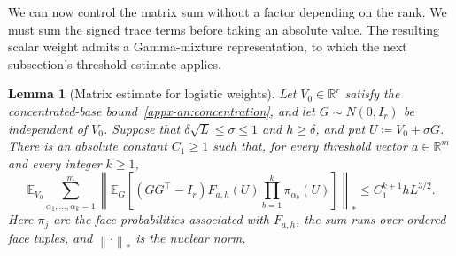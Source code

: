 \documentclass[11pt,letterpaper]{article}
\newtheorem{lemma}{Lemma}
\theoremstyle{remark}
\newcommand{\E}{\mathbb E}
\newcommand{\R}{\mathbb R}
\newcommand{\norm}[1]{\left\lVert#1\right\rVert}
\begin{document}
We can now control the matrix sum without a factor depending on the
rank. We must sum the signed trace terms before taking an absolute value.
The resulting scalar weight admits a Gamma-mixture representation,
to which the next subsection's threshold estimate applies.

\begin{lemma}[Matrix estimate for logistic weights]
\label{appx-an:lem:matrix}
Let \(V_0\in\R^r\) satisfy the concentrated-base
bound~\eqref{appx-an:concentration}, and let \(G\sim N(0,I_r)\) be
independent of \(V_0\). Suppose that
\(\delta\sqrt L\le\sigma\le1\) and \(h\ge\delta\), and put
\(U\coloneqq V_0+\sigma G\). There is an absolute constant
\(C_1\ge1\) such that, for every threshold vector \(a\in\R^m\)
and every integer \(k\ge1\),
\begin{equation}
 \E_{V_0}\sum_{\alpha_1,\ldots,\alpha_k=1}^m
 \left\|\E_G\left[(GG^\top-I_r)F_{a,h}(U)
              \prod_{b=1}^k\pi_{\alpha_b}(U)\right]\right\|_*
 \le C_1^{k+1}hL^{3/2}.
 \label{appx-an:matrix-bound}
\end{equation}
Here \(\pi_j\) are the face probabilities associated with
\(F_{a,h}\), the sum runs over ordered face tuples, and
\(\norm{\cdot}_*\) is the nuclear norm.
\end{lemma}
\end{document}
